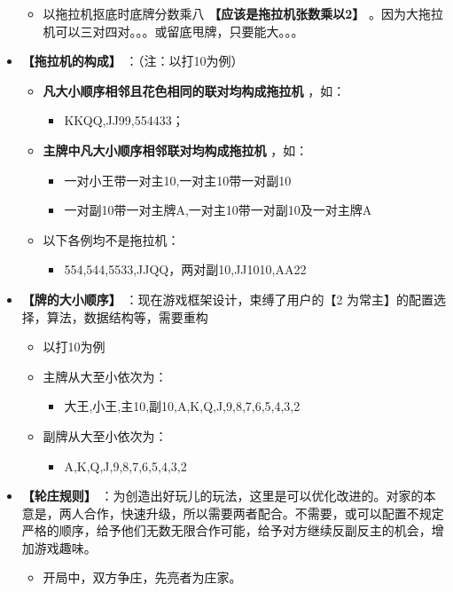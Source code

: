 \documentclass[9pt, b5paper]{article}
\begin{document}
\begin{itemize}
\begin{itemize}
\item 以拖拉机抠底时底牌分数乘八 \textbf{【应该是拖拉机张数乘以2】} 。因为大拖拉机可以三对四对。。。或留底甩牌，只要能大。。。
\end{itemize}
\item \textbf{【拖拉机的构成】} ：（注：以打10为例）
\begin{itemize}
\item \textbf{凡大小顺序相邻且花色相同的联对均构成拖拉机} ，如：
\begin{itemize}
\item KKQQ,JJ99,554433；
\end{itemize}
\item \textbf{主牌中凡大小顺序相邻联对均构成拖拉机} ，如：
\begin{itemize}
\item 一对小王带一对主10,一对主10带一对副10
\item 一对副10带一对主牌A,一对主10带一对副10及一对主牌A
\end{itemize}
\item 以下各例均不是拖拉机：
\begin{itemize}
\item 554,544,5533,JJQQ，两对副10,JJ1010,AA22
\end{itemize}
\end{itemize}
\item \textbf{【牌的大小顺序】} ：现在游戏框架设计，束缚了用户的【2 为常主】的配置选择，算法，数据结构等，需要重构
\begin{itemize}
\item 以打10为例
\item 主牌从大至小依次为：
\begin{itemize}
\item 大王,小王,主10,副10,A,K,Q,J,9,8,7,6,5,4,3,2
\end{itemize}
\item 副牌从大至小依次为：
\begin{itemize}
\item A,K,Q,J,9,8,7,6,5,4,3,2
\end{itemize}
\end{itemize}
\item \textbf{【轮庄规则】} ：为创造出好玩儿的玩法，这里是可以优化改进的。对家的本意是，两人合作，快速升级，所以需要两者配合。不需要，或可以配置不规定严格的顺序，给予他们无数无限合作可能，给予对方继续反副反主的机会，增加游戏趣味。
\begin{itemize}
\item 开局中，双方争庄，先亮者为庄家。

\end{itemize}
\end{itemize}
\end{document}
